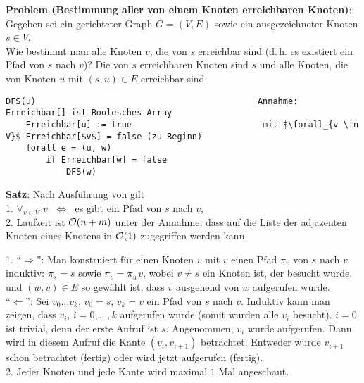 \textbf{Problem (Bestimmung aller von einem Knoten erreichbaren Knoten)}: \\
Gegeben sei ein gerichteter Graph $G = (V, E)$ sowie ein ausgezeichneter Knoten
$s \in V$. \\
Wie bestimmt man alle Knoten $v$, die von $s$ erreichbar sind
(d.\,h. es existiert ein Pfad von $s$ nach $v$)?
Die von $s$ erreichbaren Knoten sind $s$ und alle Knoten, die von
Knoten $u$ mit $(s, u) \in E$ erreichbar sind.

\begin{lstlisting}
DFS(u)                                            Annahme: Erreichbar[] ist Boolesches Array
    Erreichbar[u] := true                          mit $\forall_{v \in V}$ Erreichbar[$v$] = false (zu Beginn)
    forall e = (u, w)
        if Erreichbar[w] = false
            DFS(w)
\end{lstlisting}

\textbf{Satz}: Nach Ausführung von  gilt \\
1. $\forall_{v \in V}$ \code{Erreichbar[}$v$\code{] = true}
$\;\Leftrightarrow\;$ es gibt ein Pfad von $s$ nach $v$, \\
2. Laufzeit ist $\mathcal{O}(n + m)$ unter der Annahme, dass auf die Liste der
adjazenten Knoten eines Knotens in $\mathcal{O}(1)$ zugegriffen werden kann.

\begin{Beweis}
    1. "`$\Rightarrow$"':
    Man konstruiert für einen Knoten $v$ mit
    \code{Erreichbar[}$v$\code{] = true}
    einen Pfad $\pi_v$ von $s$ nach $v$ induktiv:
    $\pi_s = s$ sowie $\pi_v = \pi_w v$, wobei $v \not= s$ ein Knoten ist,
    der besucht wurde, und $(w, v) \in E$ so gewählt ist, dass
    $v$\code{)} ausgehend von $w$\code{)} aufgerufen
    wurde. \\
    "`$\Leftarrow$"':
    Sei $v_0 \dotsc v_k$, $v_0 = s$, $v_k = v$ ein Pfad von $s$ nach $v$.
    Induktiv kann man zeigen, dass $v_i$\code{)}, $i = 0, \dotsc, k$
    aufgerufen wurde (somit wurden alle $v_i$ besucht).
    $i = 0$ ist trivial, denn der erste Aufruf ist $s$\code{)}.
    Angenommen, $v_i$\code{)} wurde aufgerufen.
    Dann wird in diesem Aufruf die Kante $(v_i, v_{i+1})$ betrachtet.
    Entweder wurde $v_{i+1}$ schon betrachtet (fertig) oder wird jetzt
    aufgerufen (fertig). \\
    2. Jeder Knoten und jede Kante wird maximal $1$ Mal angeschaut.
\end{Beweis}

